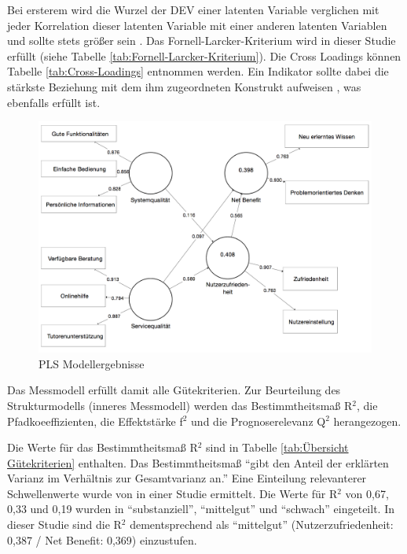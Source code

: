 Bei ersterem wird die Wurzel der DEV einer latenten Variable verglichen mit jeder Korrelation dieser latenten Variable mit einer anderen latenten Variablen und sollte stets größer sein \parencite[vgl.][S.26]{nitzl2010anwenderorientierte}. Das Fornell-Larcker-Kriterium wird in dieser Studie erfüllt (siehe Tabelle \ref{tab:Fornell-Larcker-Kriterium}). Die Cross Loadings können Tabelle \ref{tab:Cross-Loadings} entnommen werden. Ein Indikator sollte dabei die stärkste Beziehung mit dem ihm zugeordneten Konstrukt aufweisen \parencite[vgl.][S.26]{nitzl2010anwenderorientierte}, was ebenfalls erfüllt ist.   \nocite{fornell1981evaluating}

\begin{figure}[h]
\centering
\includegraphics[width=1\textwidth]{Grafiken/pls_bw_3.png}
\caption{PLS Modellergebnisse}
\label{PLS Modellergebnisse}
\end{figure}


Das Messmodell erfüllt damit alle Gütekriterien. Zur Beurteilung des Strukturmodells (inneres Messmodell) werden das Bestimmtheitsmaß R$^2$, die Pfadkoeeffizienten, die Effektstärke f$^2$ und die Prognoserelevanz Q$^2$ herangezogen.  

Die Werte für das Bestimmtheitsmaß R$^2$ sind in Tabelle \ref{tab:Übersicht Gütekriterien} enthalten. Das Bestimmtheitsmaß "`gibt den Anteil der erklärten Varianz im Verhältnis zur Gesamtvarianz an."' \parencite[S.32]{nitzl2010anwenderorientierte} Eine Einteilung relevanterer Schwellenwerte wurde von \textcite[S.323]{chin1998partial} in einer Studie ermittelt. Die Werte für R$^2$ von 0,67, 0,33 und 0,19 wurden in "`substanziell"', "`mittelgut"' und "`schwach"' eingeteilt. In dieser Studie sind die R$^2$ dementsprechend als "`mittelgut"' (Nutzerzufriedenheit: 0,387 / Net Benefit: 0,369) einzustufen.

